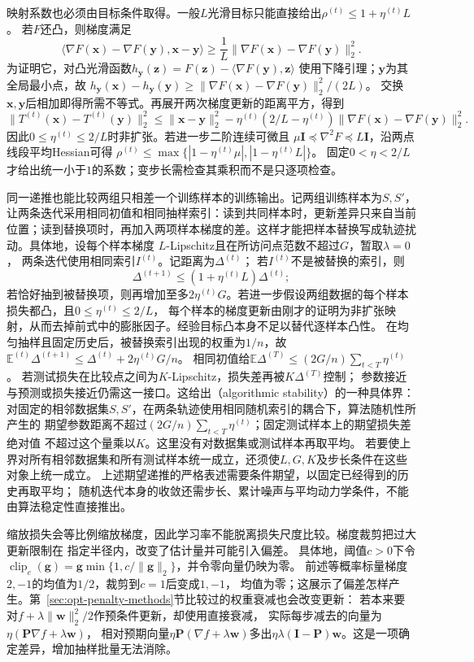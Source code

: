 映射系数也必须由目标条件取得。一般$L$光滑目标只能直接给出$\rho^{(t)}\leq1+\eta^{(t)}L$。
若$F$还凸，则梯度满足
\[
 \langle\nabla F(\bm x)-\nabla F(\bm y),\bm x-\bm y\rangle
 \geq\frac1L\|\nabla F(\bm x)-\nabla F(\bm y)\|_2^2.
\]
为证明它，对凸光滑函数$h_{\bm y}(\bm z)=F(\bm z)-\langle\nabla F(\bm y),\bm z\rangle$
使用下降引理；$\bm y$为其全局最小点，故
$h_{\bm y}(\bm x)-h_{\bm y}(\bm y)\geq
\|\nabla F(\bm x)-\nabla F(\bm y)\|_2^2/(2L)$。
交换$\bm x,\bm y$后相加即得所需不等式。再展开两次梯度更新的距离平方，得到
\[
 \|T^{(t)}(\bm x)-T^{(t)}(\bm y)\|_2^2
 \leq\|\bm x-\bm y\|_2^2
 -\eta^{(t)}(2/L-\eta^{(t)})\|\nabla F(\bm x)-\nabla F(\bm y)\|_2^2.
\]
因此$0\leq\eta^{(t)}\leq2/L$时非扩张。若进一步二阶连续可微且
$\mu\bm I\preceq\nabla^2F\preceq L\bm I$，沿两点线段平均Hessian可得
$\rho^{(t)}\leq\max\{|1-\eta^{(t)}\mu|,|1-\eta^{(t)}L|\}$。
固定$0<\eta<2/L$才给出统一小于$1$的系数；变步长需检查其乘积而不是只逐项检查。

同一递推也能比较两组只相差一个训练样本的训练输出。记两组训练样本为$S,S'$，让两条迭代采用相同初值和相同抽样索引：读到共同样本时，更新差异只来自当前位置；读到替换项时，再加入两项样本梯度的差。这样才能把样本替换写成轨迹扰动。具体地，设每个样本梯度
$L$-Lipschitz且在所访问点范数不超过$G$，暂取$\lambda=0$，
两条迭代使用相同索引$I^{(t)}$。记距离为$\Delta^{(t)}$；
若$I^{(t)}$不是被替换的索引，则
\[
  \Delta^{(t+1)}\leq(1+\eta^{(t)}L)\Delta^{(t)};
\]
若恰好抽到被替换项，则再增加至多$2\eta^{(t)}G$。若进一步假设两组数据的每个样本损失都凸，且$0\leq\eta^{(t)}\leq2/L$，
每个样本的梯度更新由刚才的证明为非扩张映射，从而去掉前式中的膨胀因子。经验目标凸本身不足以替代逐样本凸性。
在均匀抽样且固定历史后，被替换索引出现的权重为$1/n$，故
$\mathbb E^{(t)}\Delta^{(t+1)}\leq\Delta^{(t)}+2\eta^{(t)}G/n$。
相同初值给$\mathbb E\Delta^{(T)}\leq(2G/n)\sum_{t<T}\eta^{(t)}$。
若测试损失在比较点之间为$K$-Lipschitz，损失差再被$K\Delta^{(T)}$控制；
参数接近与预测或损失接近仍需这一接口。这给出（algorithmic stability）的一种具体界：
对固定的相邻数据集$S,S'$，在两条轨迹使用相同随机索引的耦合下，算法随机性所产生的
期望参数距离不超过$(2G/n)\sum_{t<T}\eta^{(t)}$；固定测试样本上的期望损失差绝对值
不超过这个量乘以$K$。这里没有对数据集或测试样本再取平均。
若要使上界对所有相邻数据集和所有测试样本统一成立，还须使$L,G,K$及步长条件在这些对象上统一成立。
上述期望递推的严格表述需要条件期望，以固定已经得到的历史再取平均；
随机迭代本身的收敛还需步长、累计噪声与平均动力学条件，不能由算法稳定性直接推出。

缩放损失会等比例缩放梯度，因此学习率不能脱离损失尺度比较。梯度裁剪把过大更新限制在
指定半径内，改变了估计量并可能引入偏差。
具体地，阈值$c>0$下令
$\operatorname{clip}_c(\bm g)=\bm g\min\{1,c/\|\bm g\|_2\}$，并令零向量仍映为零。
前述等概率标量梯度$2,-1$的均值为$1/2$，裁剪到$c=1$后变成$1,-1$，
均值为零；这展示了偏差怎样产生。第~\ref{sec:opt-penalty-methods}节比较过的权重衰减也会改变更新：
若本来要对$f+\lambda\|\bm w\|_2^2/2$作预条件更新，却使用直接衰减，
实际每步减去的向量为$\eta(\bm P\nabla f+\lambda\bm w)$，
相对预期向量$\eta\bm P(\nabla f+\lambda\bm w)$多出$\eta\lambda(\bm I-\bm P)\bm w$。这是一项确定差异，增加抽样批量无法消除。

